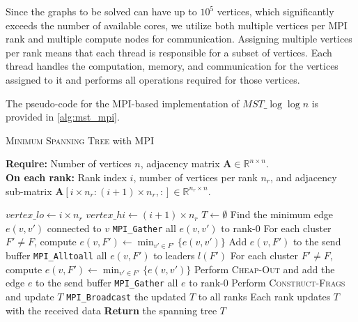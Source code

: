 \documentclass[english, 12pt, a4paper, elec, utf8, a-2b, online]{aaltothesis}
\newcommand{\mstalgo}{$MST\_\log\log{n}$}
\begin{document}
Since the graphs to be solved can have up to $10^5$ vertices, which significantly exceeds the number of available cores, we utilize both multiple vertices per MPI rank and multiple compute nodes for communication. Assigning multiple vertices per rank means that each thread is responsible for a subset of vertices. Each thread handles the computation, memory, and communication for the vertices assigned to it and performs all operations required for those vertices. 

The pseudo-code for the MPI-based implementation of \mstalgo{} is provided in \cref{alg:mst_mpi}.
\begin{algorithm}
	\caption{\textsc{Minimum Spanning Tree} with MPI}
	\label{alg:mst_mpi}
	\textbf{Require:} Number of vertices $n$, adjacency matrix $\mathbf{A} \in \mathbb{R}^{n \times n}$.\\
	\textbf{On each rank:} Rank index $i$, number of vertices per rank $n_r$, and adjacency sub-matrix $\mathbf{A}[i \times n_r : (i + 1) \times n_r, :] \in \mathbb{R}^{n_r \times n}$.
	\begin{algorithmic}[1]
	\State $vertex\_lo \gets i \times n_r$
	\State $vertex\_hi \gets (i + 1) \times n_r$
	\State $T \gets \emptyset$
		  \label{alg:step1}
				\State Find the minimum edge $e(v, v')$ connected to $v$
			\EndFor
			\State \texttt{MPI\_Gather} all $e(v, v')$ to rank-0
		\Else
			 \label{alg:step2}
				\State For each cluster $F' \neq F$, compute $e(v, F') \gets \min_{v' \in F'} \{ e(v, v') \}$
				\State Add $e(v, F')$ to the send buffer
			\EndFor
			\State \texttt{MPI\_Alltoall} all $e(v, F')$ to leaders $l(F')$
			 \label{alg:step3}
					\State For each cluster $F' \neq F$, compute $e(v, F') \gets \min_{v' \in F'} \{ e(v, v') \}$
					\State Perform \textsc{Cheap-Out} and add the edge $e$ to the send buffer
				\EndIf
			\EndFor
			\State \texttt{MPI\_Gather} all $e$ to rank-0
		\EndIf
		  \label{alg:step4}
			\State Perform \textsc{Construct-Frags} and update $T$
			\State \texttt{MPI\_Broadcast} the updated $T$ to all ranks
		\EndIf
		 \label{alg:step5} \label{alg:step6}
		\State Each rank updates $T$ with the received data
	\EndWhile
	\State \textbf{Return} the spanning tree $T$
	\end{algorithmic}
\end{algorithm}
\end{document}
